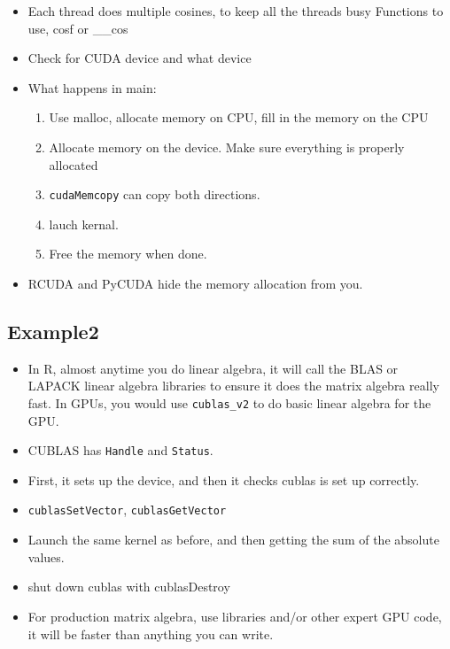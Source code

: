 \documentclass[11pt]{article}
\begin{document}
\begin{itemize}
\item Each thread does multiple cosines, to keep all the threads busy Functions to use, cosf or \_\_cos
\item Check for CUDA device and what device
\item What happens in main:
\begin{enumerate}
\item Use malloc, allocate memory on CPU, fill in the memory on the CPU
\item Allocate memory on the device.  Make sure everything is properly allocated
\item \verb~cudaMemcopy~ can copy both directions.
\item lauch kernal.
\item Free the memory when done.
\end{enumerate}
\item RCUDA and PyCUDA hide the memory allocation from you.
\end{itemize}
\subsection{Example2}
\label{sec-6-3}

\begin{itemize}
\item In R, almost anytime you do linear algebra, it will call the BLAS or LAPACK
  linear algebra libraries to ensure it does the matrix algebra really fast.
  In GPUs, you would use \verb~cublas_v2~ to do basic linear algebra for the GPU.
\item CUBLAS has \verb~Handle~ and \verb~Status~.
\item First, it sets up the device, and then it checks cublas is set up
  correctly.
\item \verb~cublasSetVector~, \verb~cublasGetVector~
\item Launch the same kernel as before, and then getting the sum of the
  absolute values.
\item shut down cublas with cublasDestroy
\item For production matrix algebra, use libraries and/or other expert GPU code, it will be faster than anything you can write.
\end{itemize}
\end{document}
